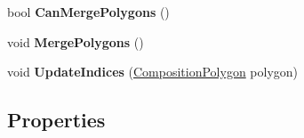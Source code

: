 \begin{DoxyCompactItemize}
bool {\bfseries Can\+Merge\+Polygons} ()
\item 
\mbox{\label{class_super_tiled2_unity_1_1_editor_1_1_geometry_1_1_polygon_edge_a3bc0bda4b8cffe3a9b507e3047784034}} 
void {\bfseries Merge\+Polygons} ()
\item 
\mbox{\label{class_super_tiled2_unity_1_1_editor_1_1_geometry_1_1_polygon_edge_a9715363f808609644edd30e08c3825bf}} 
void {\bfseries Update\+Indices} (\mbox{\hyperlink{class_super_tiled2_unity_1_1_editor_1_1_geometry_1_1_composition_polygon}{Composition\+Polygon}} polygon)
\end{DoxyCompactItemize}
\subsection*{Properties}
